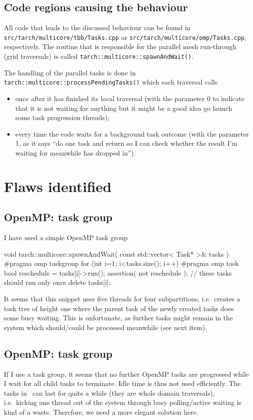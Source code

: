 \subsection{Code regions causing the behaviour}

All code that leads to the discussed behaviour can be found in
\texttt{src/tarch/multicore/tbb/Tasks.cpp} or
\texttt{src/tarch/multicore/omp/Tasks.cpp}, respectively.
The routine that is responsible for the parallel mesh run-through (grid
traversals) is called \texttt{tarch::multicore::spawnAndWait()}.


The handling of the parallel tasks is done in
\texttt{tarch::multicore::processPendingTasks()} which each traversal calls
\begin{itemize}
  \item once after it has finished its local traversal (with the parameter 0 to
  indicate that it is not waiting for anything but it might be a good idea go
  launch some task progression threads);
  \item every time the code waits for a background task outcome (with the
  parameter 1, as it says ``do one task and return so I can check whether the
  result I'm waiting for meanwhile has dropped in'').
\end{itemize}


\section{Flaws identified}


\subsection{OpenMP: task group}

I have used a simple OpenMP task group
\begin{code}
void tarch::multicore::spawnAndWait(
  const std::vector< Task* >&  tasks
) {
  #pragma omp taskgroup
  for (int i=1; i<tasks.size(); i++) {
    #pragma omp task
    {
      bool reschedule = tasks[i]->run();
      assertion( not reschedule ); // these tasks should run only once
      delete tasks[i];
    }
  }
}
\end{code}

\noindent
It seems that this snippet uses five threads for four subpartitions,
i.e.~creates a task tree of height one where the parent task of the newly
created tasks does some busy waiting.
This is unfortunate, as further tasks might remain in the system which
should/could be processed meanwhile (see next item).



\subsection{OpenMP: task group}

If I use a task group, it seems that no further OpenMP tasks are progressed
while I wait for all child tasks to terminate.
Idle time is thus not used efficiently.
The tasks in \Peano\ can last for quite a while (they are whole domain
traversals), i.e.~kicking one thread out of the system through busy
polling/active waiting is kind of a waste.
Therefore, we need a more elegant solution here.
